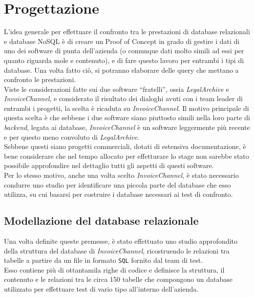 
\chapter{Progettazione}
\label{cap:progettazione}

L'idea generale per effettuare il confronto tra le prestazioni di database relazionali e database NoSQL è di creare un \gls{Proof of Concept} in grado di gestire i dati di uno dei software di punta dell'azienda (o comunque dati molto simili ad essi per quanto riguarda mole e contenuto), e di fare questo lavoro per entrambi i tipi di database. Una volta fatto ciò, si potranno elaborare delle query che mettano a confronto le prestazioni.\\

\noindent Viste le considerazioni fatte sui due software ``fratelli'', ossia \textit{LegalArchive} e \textit{InvoiceChannel}, e considerato il risultato dei dialoghi avuti con i team leader di entrambi i progetti, la scelta è ricaduta su \textit{InvoiceChannel}. Il motivo principale di questa scelta è che sebbene i due software siano piuttosto simili nella loro parte di \textit{backend}, legata ai database, \textit{InvoiceChannel} è un software leggermente più recente e per questo meno convoluto di \textit{LegalArchive}.\\
Sebbene questi siano progetti commerciali, dotati di estensiva documentazione, è bene considerare che nel tempo allocato per effetturare lo stage non sarebbe stato possibile approfondire nel dettaglio tutti gli aspetti di questi software.\\
Per lo stesso motivo, anche una volta scelto \textit{InvoiceChannel}, è stato necessario condurre uno studio per identificare una piccola parte del database che esso utilizza, su cui basarsi per costruire i database necessari ai test di confronto.\\


\section{Modellazione del database relazionale}
Una volta definite queste premesse, è stato effettuato uno studio approfondito della struttura del database di \textit{InvoiceChannel}, ricostruendo le relazioni tra tabelle a partire da un file in formato \texttt{SQL} fornito dal team di test.\\
Esso contiene più di ottantamila righe di codice e definisce la struttura, il contenuto e le relazioni tra le circa 150 tabelle che compongono un database utilizzato per effettuare test di vario tipo all'interno dell'azienda.\\

